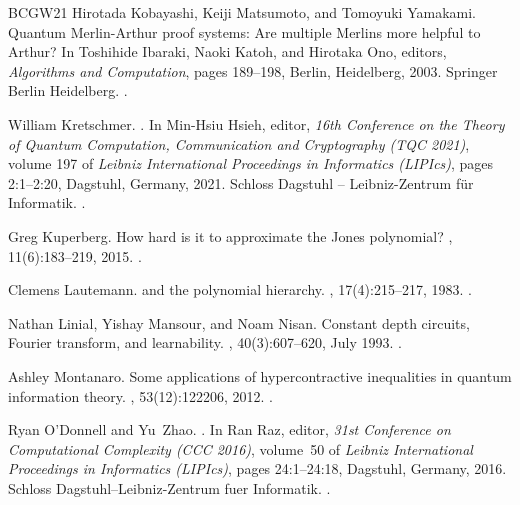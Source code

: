 \documentclass[10pt,a4paper]{article}
\begin{document}
\begin{thebibliography}{BCGW21}
Hirotada Kobayashi, Keiji Matsumoto, and Tomoyuki Yamakami.
\newblock Quantum {M}erlin-{A}rthur proof systems: Are multiple {M}erlins more
  helpful to {A}rthur?
\newblock In Toshihide Ibaraki, Naoki Katoh, and Hirotaka Ono, editors, {\em
  Algorithms and Computation}, pages 189--198, Berlin, Heidelberg, 2003.
  Springer Berlin Heidelberg.
\newblock \href {https://doi.org/10.1007/978-3-540-24587-2_21}
  {}.

William Kretschmer.
.
\newblock In Min-Hsiu Hsieh, editor, {\em 16th Conference on the Theory of
  Quantum Computation, Communication and Cryptography (TQC 2021)}, volume 197
  of {\em Leibniz International Proceedings in Informatics (LIPIcs)}, pages
  2:1--2:20, Dagstuhl, Germany, 2021. Schloss Dagstuhl -- Leibniz-Zentrum
  f{\"u}r Informatik.
\newblock \href {https://doi.org/10.4230/LIPIcs.TQC.2021.2}
  {}.

Greg Kuperberg.
\newblock How hard is it to approximate the {J}ones polynomial?
, 11(6):183--219, 2015.
\newblock \href {https://doi.org/10.4086/toc.2015.v011a006}
  {}.

Clemens Lautemann.
 and the polynomial hierarchy.
, 17(4):215--217, 1983.
\newblock \href {https://doi.org/10.1016/0020-0190(83)90044-3}
  {}.

Nathan Linial, Yishay Mansour, and Noam Nisan.
\newblock Constant depth circuits, {F}ourier transform, and learnability.
, 40(3):607--620, July 1993.
\newblock \href {https://doi.org/10.1145/174130.174138}
  {}.

Ashley Montanaro.
\newblock Some applications of hypercontractive inequalities in quantum
  information theory.
, 53(12):122206, 2012.
\newblock \href {https://doi.org/10.1063/1.4769269}
  {}.

Ryan O'Donnell and Yu~Zhao.
.
\newblock In Ran Raz, editor, {\em 31st Conference on Computational Complexity
  (CCC 2016)}, volume~50 of {\em Leibniz International Proceedings in
  Informatics (LIPIcs)}, pages 24:1--24:18, Dagstuhl, Germany, 2016. Schloss
  Dagstuhl--Leibniz-Zentrum fuer Informatik.
\newblock \href {https://doi.org/10.4230/LIPIcs.CCC.2016.24}
  {}.


\end{thebibliography}
\end{document}
